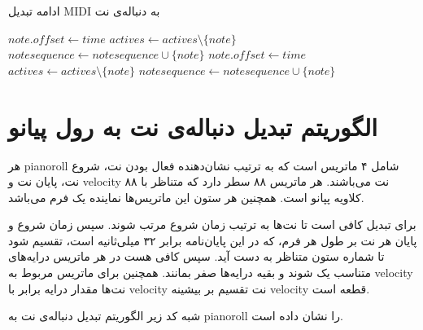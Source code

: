 \setcounter{algorithm}{0}
\begin{algorithm}
\caption{ادامه تبدیل \gls{MIDI} به دنباله‌ی نت}
\begin{algorithmic}
\begin{latin}
                    \State $note.offset \leftarrow time$
                    \State $actives \leftarrow actives \setminus \{note\}$
                    \State $notesequence \leftarrow notesequence \cup \{note\}$
                \EndIf
            \EndFor
        \EndIf
    \EndFor
        \State $note.offset \leftarrow time$
        \State $actives \leftarrow actives \setminus \{note\}$
        \State $notesequence \leftarrow notesequence \cup \{note\}$
    \EndFor
\end{latin}
\end{algorithmic}
\end{algorithm}

\section{الگوریتم تبدیل دنباله‌ی نت به رول پیانو}
هر \gls{pianoroll} شامل ۴ ماتریس است که به ترتیب نشان‌دهنده فعال بودن نت، شروع
نت، پایان نت و \gls{velocity} نت می‌باشند. هر ماتریس ۸۸ سطر دارد که متناظر با ۸۸
کلاویه پپانو است. همچنین هر ستون این ماتریس‌ها نماینده یک فرم می‌باشد.

برای تبدیل کافی است تا نت‌ها به ترتیب زمان شروع مرتب شوند. سپس زمان شروع و پایان
هر نت بر طول هر فرم، که در این پایان‌نامه برابر ۳۲ میلی‌ثانیه است، تقسیم شود تا
شماره ستون متناظر به دست آید. سپس کافی هست در هر ماتریس درایه‌های متناسب یک شوند
و بقیه درایه‌ها صفر بمانند. همچنین برای ماتریس مربوط به \gls{velocity} نت‌ها
مقدار درایه برابر با \gls{velocity} نت تقسیم بر بیشینه \gls{velocity} قطعه است.

شبه کد زیر الگوریتم تبدیل دنباله‌ی نت به \gls{pianoroll} را نشان داده است.

